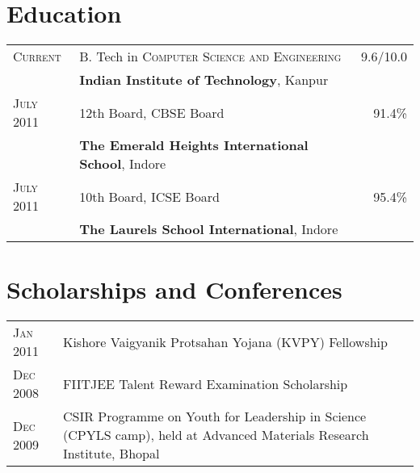 \documentclass[a4paper,10pt]{article} %
\begin{document}
\section{Education}

\begin{tabular}{>{\raggedleft}p{2.2cm}p{14cm}r}

    \textsc{Current} & B. Tech in \textsc{Computer Science and Engineering} &   9.6/10.0\\
                     & \textbf{Indian Institute of Technology}, Kanpur\\

    \textsc{July 2011} & 12th Board, \textsc{CBSE} Board                    &   91.4\% \\
                       & \normalsize\textbf{The Emerald Heights International School}, Indore\\

    \textsc{July 2011} & 10th Board, \textsc{ICSE} Board                    &   95.4\% \\
                       & \normalsize\textbf{The Laurels School International}, Indore \\

\end{tabular}

\section{Scholarships and Conferences}

\begin{tabular}{>{\raggedleft}p{2.2cm}p{15cm}}

    \textsc{Jan 2011} & Kishore Vaigyanik Protsahan Yojana (KVPY) Fellowship \\
    \textsc{Dec 2008} & FIITJEE Talent Reward Examination Scholarship \\
    \textsc{Dec 2009} & CSIR Programme on Youth for Leadership in Science (CPYLS camp),
                        held at Advanced Materials Research Institute, Bhopal\\

\end{tabular}

\end{document}
